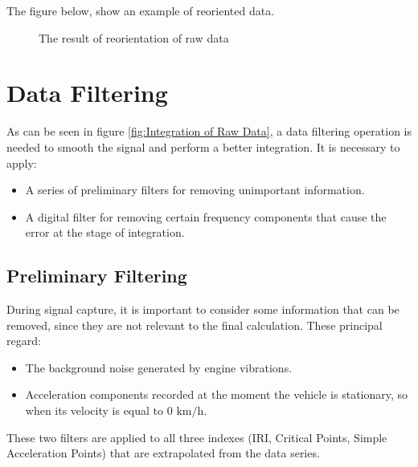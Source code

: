\documentclass[tesi]{subfiles}
\begin{document}
\noindent The figure below, show an example of reoriented data.
\begin{figure}[H]
  \centering
  

 
  \caption{The result of reorientation of raw data}
  \label{fig:Accelerometer Reoriented}
\end{figure}

\section{Data Filtering} \label{sc:Data Filtering}
As can be seen in figure \ref{fig:Integration of Raw Data}, a data filtering operation is needed to smooth the signal and perform a better integration.
It is necessary to apply:

\begin{itemize}
\item A series of preliminary filters for removing unimportant information.
\item A digital filter for removing certain frequency components that cause the error at the stage of integration.
\end{itemize}



\subsection{Preliminary Filtering}\label{ssc:Preliminary Filtering}
During signal capture, it is important to consider some information that can be removed, since they are not relevant to the final calculation. These principal regard:
\begin{itemize}
\item The background noise generated by engine vibrations.
\item Acceleration components recorded at the moment the vehicle is stationary, so when its velocity is equal to $0$ $\si{\km\per\hour}$.
\end{itemize}

\noindent These two filters are applied to all three indexes (IRI, Critical Points, Simple Acceleration Points) that are extrapolated from the data series.
\end{document}
